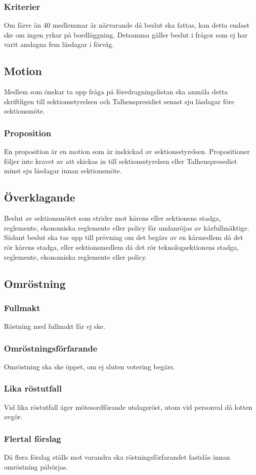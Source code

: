 \documentclass[a4paper]{dtek}
\begin{document}
\subsubsection{Kriterier}
Om färre än 40 medlemmar är närvarande då beslut ska fattas, kan detta endast ske om ingen yrkar på bordläggning. Detsamma gäller beslut i frågor som ej har varit anslagna fem läsdagar i förväg.
\subsection{Motion}
Medlem som önskar ta upp fråga på föredragningslistan ska anmäla detta skriftligen till sektionsstyrelsen och Talhenspresidiet senast sju läsdagar före sektionsmöte.
\subsubsection{Proposition}
En proposition är en motion som är inskickad av sektionsstyrelsen.
Propositioner följer inte kravet av att skickas in till sektionsstyrelsen eller Talhenspresediet minst sju läsdagar innan sektionsmöte.
\subsection{Överklagande}
Beslut av sektionsmötet som strider mot kårens eller sektionens stadga, reglemente, ekonomiska reglemente eller policy får undanröjas av kårfullmäktige. Sådant beslut ska tas upp till prövning om det begärs av en kårmedlem då det rör kårens stadga, eller sektionsmedlem då det rör teknologsektionens stadga, reglemente, ekonomiska reglemente eller policy.
\subsection{Omröstning}
\subsubsection{Fullmakt}
Röstning med fullmakt får ej ske.
\subsubsection{Omröstningsförfarande}
Omröstning ska ske öppet, om ej sluten votering begärs.
\subsubsection{Lika röstutfall}
Vid lika röstutfall äger mötesordförande utslagsröst, utom vid personval då lotten avgör.
\subsubsection{Flertal förslag}
Då flera förslag ställs mot varandra ska röstningsförfarandet fastslås innan omröstning påbörjas.
\end{document}
